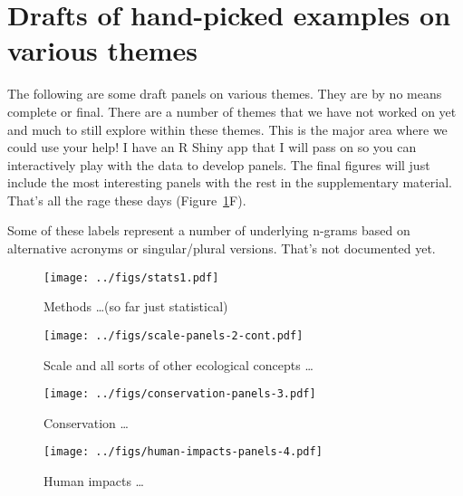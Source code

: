 \documentclass[12pt]{article}
\begin{document}
\clearpage

\section*{Drafts of hand-picked examples on various themes}

The following are some draft panels on various themes. They are by no means
complete or final. There are a number of themes that we have not worked on yet and much to still explore within these themes. 
This is the major area where we could use your help! I have an R Shiny app that
I will pass on so you can interactively play with the data to develop panels.
The final figures will just include the most interesting panels with the rest in the supplementary material. That's all the rage these days (Figure~\ref{fig:methods}F).

Some of these labels represent a number of underlying n-grams based on alternative acronyms or singular/plural versions. That's not documented yet.

\begin{figure}[htbp]
\centering
\texttt{[image: ../figs/stats1.pdf]}
\caption{Methods \ldots (so far just statistical)}
\label{fig:methods}
\end{figure}

\clearpage

\begin{figure}[htbp]
\centering
\texttt{[image: ../figs/scale-panels-2-cont.pdf]}
\caption{Scale and all sorts of other ecological concepts  \ldots}
\end{figure}

\clearpage

\begin{figure}[htbp]
\centering
\texttt{[image: ../figs/conservation-panels-3.pdf]}
\caption{Conservation \ldots}
\end{figure}

\clearpage

\begin{figure}[htbp]
\centering
\texttt{[image: ../figs/human-impacts-panels-4.pdf]}
\caption{Human impacts \ldots}
\end{figure}
\end{document}
